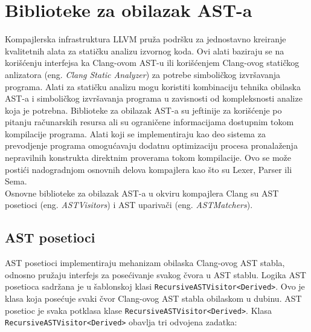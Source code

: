 \documentclass[12pt,oneside]{memoir}
\begin{document}
\section{Biblioteke za obilazak AST-a}

Kompajlerska infrastruktura LLVM pru\v{z}a podr\v{s}ku za jednostavno kreiranje kvalitetnih alata za stati\v{c}ku analizu izvornog koda. Ovi alati
baziraju se na kori\v{s}\'{c}enju interfejsa ka Clang-ovom AST-u ili kori\v{s}\'{c}enjem Clang-ovog stati\v{c}kog anlizatora (eng. \textit{Clang Static Analyzer}) za potrebe simboli\v{c}kog izvr\v{s}avanja programa. Alati za stati\v{c}ku analizu mogu koristiti kombinaciju tehnika obilaska AST-a i simboli\v{c}kog izvr\v{s}avanja programa u zavisnosti od kompleksnosti analize koja je potrebna. Biblioteke za obilazak AST-a su jeftinije za kori\v{s}\'{c}enje po pitanju ra\v{c}unarskih resursa ali su ograni\v{c}ene informacijama dostupnim tokom kompilacije programa. Alati koji se implementiraju kao deo sistema za prevodjenje programa omogu\'{c}avaju dodatnu optimizaciju procesa pronala\v{z}enja nepravilnih konstrukta direktnim proverama tokom kompilacije. Ovo se mo\v{z}e posti\'{c}i nadogradnjom osnovnih delova kompajlera kao \v{s}to su Lexer, Parser ili Sema. \\Osnovne biblioteke za obilazak AST-a u okviru kompajlera Clang su AST posetioci (eng. \textit{ASTVisitors}) i  AST upariva\v{c}i (eng. \textit{ASTMatchers}).



\newtheorem{primer}{Primer}[section]

\subsection{AST posetioci}
AST posetioci implementiraju mehanizam obilaska Clang-ovog AST stabla, odnosno pru\v{z}aju interfejs
za pose\'{c}ivanje svakog \v{c}vora u AST stablu.
Logika AST posetioca sadr\v{z}ana je u šablonskoj klasi \lstinline{RecursiveASTVisitor<Derived>}.
Ovo je klasa koja posećuje svaki čvor Clang-ovog AST stabla obilaskom u dubinu.
AST posetioc je svaka potklasa klase \lstinline{RecursiveASTVisitor<Derived>}.
Klasa \lstinline{RecursiveASTVisitor<Derived>} obavlja tri odvojena zadatka:
\end{document}
